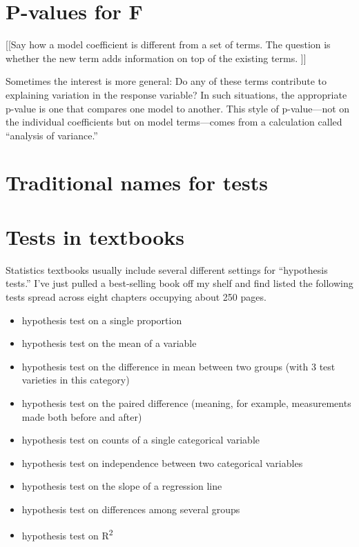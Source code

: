 \documentclass[
  letterpaper,
  DIV=11,
  numbers=noendperiod,
  oneside]{scrreprt}
\providecommand{\tightlist}{%
  \setlength{\itemsep}{0pt}\setlength{\parskip}{0pt}}\usepackage{longtable,booktabs,array}
\begin{document}
\hypertarget{p-values-for-f}{%
\section{P-values for F}\label{p-values-for-f}}

{[}{[}Say how a model coefficient is different from a set of terms. The
question is whether the new term adds information on top of the existing
terms. {]}{]}

Sometimes the interest is more general: Do any of these terms contribute
to explaining variation in the response variable? In such situations,
the appropriate p-value is one that compares one model to another. This
style of p-value---not on the individual coefficients but on model
terms---comes from a calculation called ``analysis of variance.''

\hypertarget{traditional-names-for-tests}{%
\section{Traditional names for
tests}\label{traditional-names-for-tests}}

\hypertarget{tests-in-textbooks}{%
\section{Tests in textbooks}\label{tests-in-textbooks}}

Statistics textbooks usually include several different settings for
``hypothesis tests.'' I've just pulled a best-selling book off my shelf
and find listed the following tests spread across eight chapters
occupying about 250 pages.

\begin{itemize}
\tightlist
\item
  hypothesis test on a single proportion
\item
  hypothesis test on the mean of a variable
\item
  hypothesis test on the difference in mean between two groups (with 3
  test varieties in this category)
\item
  hypothesis test on the paired difference (meaning, for example,
  measurements made both before and after)
\item
  hypothesis test on counts of a single categorical variable
\item
  hypothesis test on independence between two categorical variables
\item
  hypothesis test on the slope of a regression line
\item
  hypothesis test on differences among several groups
\item
  hypothesis test on R\textsuperscript{2}
\end{itemize}
\end{document}
